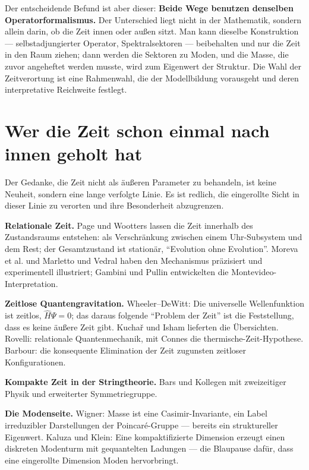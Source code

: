 Der entscheidende Befund ist aber dieser: \textbf{Beide Wege benutzen
denselben Operatorformalismus.} Der Unterschied liegt nicht in der
Mathematik, sondern allein darin, ob die Zeit innen oder außen sitzt.
Man kann dieselbe Konstruktion --- selbstadjungierter Operator,
Spektralsektoren --- beibehalten und nur die Zeit in den Raum ziehen;
dann werden die Sektoren zu Moden, und die Masse, die zuvor angeheftet
werden musste, wird zum Eigenwert der Struktur. Die Wahl der
Zeitverortung ist eine Rahmenwahl, die der Modellbildung vorausgeht und
deren interpretative Reichweite festlegt.

\section{Wer die Zeit schon einmal nach innen geholt hat}

Der Gedanke, die Zeit nicht als äußeren Parameter zu behandeln, ist
keine Neuheit, sondern eine lange verfolgte Linie. Es ist redlich, die
eingerollte Sicht in dieser Linie zu verorten und ihre Besonderheit
abzugrenzen.

\textbf{Relationale Zeit.} Page und Wootters lassen die Zeit innerhalb
des Zustandsraums entstehen: als Verschränkung zwischen einem
Uhr-Subsystem und dem Rest; der Gesamtzustand ist stationär,
\enquote{Evolution ohne Evolution}. Moreva et al. und Marletto und
Vedral haben den Mechanismus präzisiert und experimentell illustriert;
Gambini und Pullin entwickelten die Montevideo-Interpretation.

\textbf{Zeitlose Quantengravitation.} Wheeler--DeWitt: Die universelle
Wellenfunktion ist zeitlos, $\hat H\Psi = 0$; das daraus folgende
\enquote{Problem der Zeit} ist die Feststellung, dass es keine äußere
Zeit gibt. Kuchař und Isham lieferten die Übersichten. Rovelli:
relationale Quantenmechanik, mit Connes die thermische-Zeit-Hypothese.
Barbour: die konsequente Elimination der Zeit zugunsten zeitloser
Konfigurationen.

\textbf{Kompakte Zeit in der Stringtheorie.} Bars und Kollegen mit
zweizeitiger Physik und erweiterter Symmetriegruppe.

\textbf{Die Modenseite.} Wigner: Masse ist eine Casimir-Invariante, ein
Label irreduzibler Darstellungen der Poincaré-Gruppe --- bereits ein
struktureller Eigenwert. Kaluza und Klein: Eine kompaktifizierte
Dimension erzeugt einen diskreten Modenturm mit gequantelten Ladungen
--- die Blaupause dafür, dass eine eingerollte Dimension Moden
hervorbringt.

